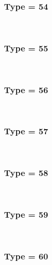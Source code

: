 \documentclass{article}
\begin{document}
        
        
            \subsubsection*{Type = 54}    
            
            \\
        
        
        
            \subsubsection*{Type = 55}    
            
            \\
        
        
        
            \subsubsection*{Type = 56}    
            
            \\
        
        
        
            \subsubsection*{Type = 57}    
            
            \\
        
        
        
            \subsubsection*{Type = 58}    
            
            \\
        
        
        
            \subsubsection*{Type = 59}    
            
            \\
        
        
        
            \subsubsection*{Type = 60}    
            
\end{document}
